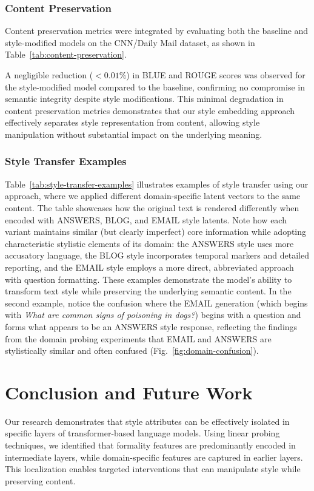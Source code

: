\documentclass[twocolumn]{article}
\begin{document}
\subsubsection{Content Preservation}
Content preservation metrics were integrated by evaluating both the baseline and style-modified models on the CNN/Daily Mail dataset, as shown in Table~\ref{tab:content-preservation}.

A negligible reduction (\(<0.01\%\)) in BLUE and ROUGE scores was observed for the style-modified model compared to the baseline, confirming no compromise in semantic integrity despite style modifications. This minimal degradation in content preservation metrics demonstrates that our style embedding approach effectively separates style representation from content, allowing style manipulation without substantial impact on the underlying meaning.

\subsubsection{Style Transfer Examples}

Table~\ref{tab:style-transfer-examples} illustrates examples of style transfer using our approach, where we applied different domain-specific latent vectors to the same content.
The table showcases how the original text is rendered differently when encoded with ANSWERS, BLOG, and EMAIL style latents.
Note how each variant maintains similar (but clearly imperfect) core information while adopting characteristic stylistic elements of its domain: the ANSWERS style uses more accusatory language, the BLOG style incorporates temporal markers and detailed reporting, and the EMAIL style employs a more direct, abbreviated approach with question formatting.
These examples demonstrate the model's ability to transform text style while preserving the underlying semantic content.
In the second example, notice the confusion where the EMAIL generation (which begins with \textit{What are common signs of poisoning in dogs?}) begins with a question and forms what appears to be an ANSWERS style response, reflecting the findings from the domain probing experiments that EMAIL and ANSWERS are stylistically similar and often confused (Fig.~\ref{fig:domain-confusion}).

\section{Conclusion and Future Work}

Our research demonstrates that style attributes can be effectively isolated in specific layers of transformer-based language models. Using linear probing techniques, we identified that formality features are predominantly encoded in intermediate layers, while domain-specific features are captured in earlier layers. This localization enables targeted interventions that can manipulate style while preserving content.
\end{document}
